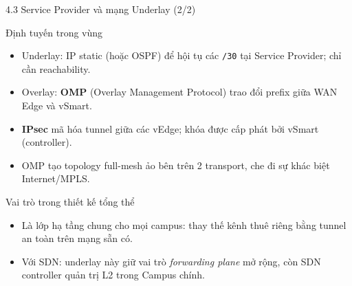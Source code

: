 \begin{frame}{4.3 Service Provider và mạng Underlay (2/2)}
    \small
    \begin{block}{Định tuyến trong vùng}
        \begin{itemize}
            \item Underlay: IP static (hoặc OSPF) để hội tụ các
                  \texttt{/30} tại Service Provider; chỉ cần reachability.
            \item Overlay: \textbf{OMP} (Overlay Management Protocol)
                  trao đổi prefix giữa WAN Edge và vSmart.
            \item \textbf{IPsec} mã hóa tunnel giữa các vEdge; khóa được
                  cấp phát bởi vSmart (controller).
            \item OMP tạo topology full-mesh ảo bên trên 2 transport,
                  che đi sự khác biệt Internet/MPLS.
        \end{itemize}
    \end{block}
    \vspace{0.12cm}
    \begin{block}{Vai trò trong thiết kế tổng thể}
        \begin{itemize}
            \item Là lớp hạ tầng chung cho mọi campus: thay thế kênh
                  thuê riêng bằng tunnel an toàn trên mạng sẵn có.
            \item Với SDN: underlay này giữ vai trò \emph{forwarding
                  plane} mở rộng, còn SDN controller quản trị L2 trong
                  Campus chính.
        \end{itemize}
    \end{block}
\end{frame}


